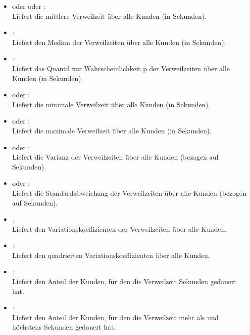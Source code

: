 \begin{itemize}

\item
{} oder  oder :\\
Liefert die mittlere Verweilzeit über alle Kunden (in Sekunden).

\item
{}:\\
Liefert den Median der Verweilzeiten über alle Kunden (in Sekunden).

\item
{}:\\
Liefert das Quantil zur Wahrscheinlichkeit p der Verweilzeiten über alle Kunden (in Sekunden).

\item
{} oder :\\
Liefert die minimale Verweilzeit über alle Kunden (in Sekunden).

\item
{} oder :\\
Liefert die maximale Verweilzeit über alle Kunden (in Sekunden).

\item
{} oder :\\
Liefert die Varianz der Verweilzeiten über alle Kunden (bezogen auf Sekunden).

\item
{} oder :\\
Liefert die Standardabweichung der Verweilzeiten über alle Kunden (bezogen auf Sekunden).

\item
{}:\\
Liefert den Variationskoeffizienten der Verweilzeiten über alle Kunden.

\item
{}:\\
Liefert den quadrierten Variationskoeffizienten über alle Kunden.

\item
{}:\\
Liefert den Anteil der Kunden, für den die Verweilzeit  Sekunden gedauert hat.

\item
{}:\\
Liefert den Anteil der Kunden, für den die Verweilzeit mehr als  und höchstens  Sekunden gedauert hat.

\end{itemize}  




